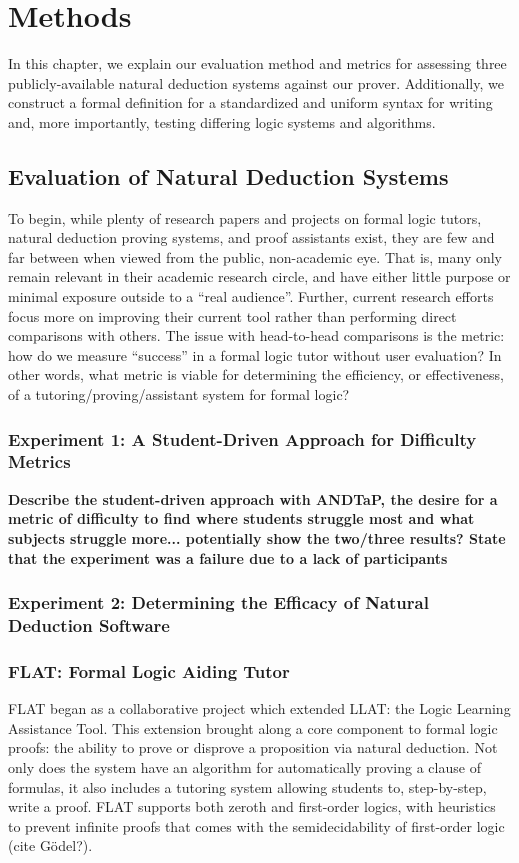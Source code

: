 \documentclass[ms]{uncgdissertationexp2}
\theoremstyle{plain}
\theoremstyle{definition}
\theoremstyle{remark}
\begin{document}
\chapter{Methods}
    In this chapter, we explain our evaluation method and metrics for assessing three publicly-available natural deduction systems against our prover. Additionally, we construct a formal definition for a standardized and uniform syntax for writing and, more importantly, testing differing logic systems and algorithms.
    \section{Evaluation of Natural Deduction Systems}
    To begin, while plenty of research papers and projects on formal logic tutors, natural deduction proving systems, and proof assistants exist, they are few and far between when viewed from the public, non-academic eye. That is, many only remain relevant in their academic research circle, and have either little purpose or minimal exposure outside to a ``real audience''. Further, current research efforts focus more on improving their current tool rather than performing direct comparisons with others. The issue with head-to-head comparisons is the metric: how do we measure ``success'' in a formal logic tutor without user evaluation? In other words, what metric is viable for determining the efficiency, or effectiveness, of a tutoring/proving/assistant system for formal logic?

    \subsection{Experiment 1: A Student-Driven Approach for Difficulty Metrics}

    \textbf{Describe the student-driven approach with ANDTaP, the desire for a metric of difficulty to find where students struggle most and what subjects struggle more... potentially show the two/three results? State that the experiment was a failure due to a lack of participants}

    \subsection{Experiment 2: Determining the Efficacy of Natural Deduction Software}

    \subsection{FLAT: Formal Logic Aiding Tutor}
    FLAT began as a collaborative project which extended LLAT: the Logic Learning Assistance Tool. This extension brought along a core component to formal logic proofs: the ability to prove or disprove a proposition via natural deduction. Not only does the system have an algorithm for automatically proving a clause of formulas, it also includes a tutoring system allowing students to, step-by-step, write a proof. FLAT supports both zeroth and first-order logics, with heuristics to prevent infinite proofs that comes with the semidecidability of first-order logic (cite G\"odel?).
\end{document}
